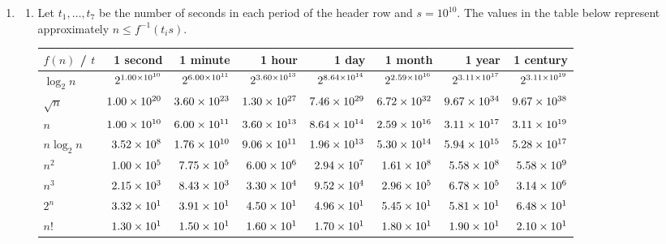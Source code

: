 \documentclass[12pt]{article}
\begin{document}
\begin{enumerate}
\begin{enumerate}
    \end{enumerate}
    \item 
    \begin{enumerate}
        \item Let $t_{1}, \dots, t_{7}$ be the number of seconds in each period of the header row and $s = 10^{10}$. The values in the table below represent approximately $n \leq f^{-1}(t_{i} s)$.
        \begin{table}[htbp]
            \renewcommand{\arraystretch}{1.2}
            \setlength{\tabcolsep}{7pt}
            \centering
            \footnotesize
            \begin{tabular}{l*{7}{r}}
                \toprule
                $f(n)$ / $t$ & 1 second & 1 minute & 1 hour & 1 day & 1 month & 1 year & 1 century \\ \midrule
                $\log_{2} n$ & $2^{\num{1.00E+10}}$ & $2^{\num{6.00E+11}}$ & $2^{\num{3.60E+13}}$ & $2^{\num{8.64E+14}}$ & $2^{\num{2.59E+16}}$ & $2^{\num{3.11E+17}}$ & $2^{\num{3.11E+19}}$ \\
                $\sqrt{n}$ & $\num{1.00E+20}$ & $\num{3.60E+23}$ & $\num{1.30E+27}$ & $\num{7.46E+29}$ & $\num{6.72E+32}$ & $\num{9.67E+34}$ & $\num{9.67E+38}$ \\
                $n$ & $\num{1.00E+10}$ & $\num{6.00E+11}$ & $\num{3.60E+13}$ & $\num{8.64E+14}$ & $\num{2.59E+16}$ & $\num{3.11E+17}$ & $\num{3.11E+19}$ \\
                $n \log_{2} n$ & $\num{3.52E+08}$ & $\num{1.76E+10}$ & $\num{9.06E+11}$ & $\num{1.96E+13}$ & $\num{5.30E+14}$ & $\num{5.94E+15}$ & $\num{5.28E+17}$ \\
                $n^{2}$ & $\num{1.00E+05}$ & $\num{7.75E+05}$ & $\num{6.00E+06}$ & $\num{2.94E+07}$ & $\num{1.61E+08}$ & $\num{5.58E+08}$ & $\num{5.58E+09}$ \\
                $n^{3}$ & $\num{2.15E+03}$ & $\num{8.43E+03}$ & $\num{3.30E+04}$ & $\num{9.52E+04}$ & $\num{2.96E+05}$ & $\num{6.78E+05}$ & $\num{3.14E+06}$ \\
                $2^{n}$ & $\num{3.32E+01}$ & $\num{3.91E+01}$ & $\num{4.50E+01}$ & $\num{4.96E+01}$ & $\num{5.45E+01}$ & $\num{5.81E+01}$ & $\num{6.48E+01}$ \\
                $n!$ & $\num{1.30E+01}$ & $\num{1.50E+01}$ & $\num{1.60E+01}$ & $\num{1.70E+01}$ & $\num{1.80E+01}$ & $\num{1.90E+01}$ & $\num{2.10E+01}$ \\
                \bottomrule
            \end{tabular}
        \end{table}

\end{enumerate}
\end{enumerate}
\end{document}
